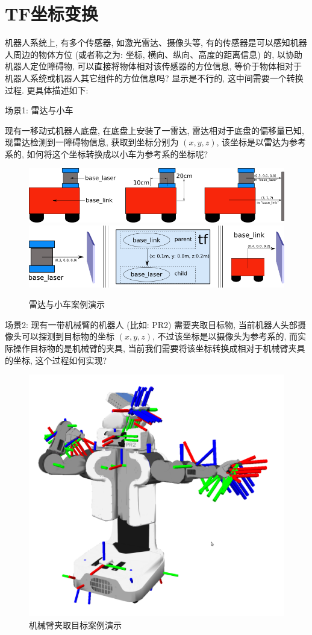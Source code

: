 \documentclass[openany, fontset=windowsold]{ctexbook}
\theoremstyle{kaiti}
\theoremstyle{normal}
\begin{document}
\section{TF坐标变换}

机器人系统上, 有多个传感器, 如激光雷达、摄像头等, 有的传感器是可以感知机器人周边的物体方位 (或者称之为: 坐标, 横向、纵向、高度的距离信息) 的, 以协助机器人定位障碍物, 可以直接将物体相对该传感器的方位信息, 等价于物体相对于机器人系统或机器人其它组件的方位信息吗? 显示是不行的, 这中间需要一个转换过程. 更具体描述如下:

场景1: 雷达与小车

现有一移动式机器人底盘, 在底盘上安装了一雷达, 雷达相对于底盘的偏移量已知, 现雷达检测到一障碍物信息, 获取到坐标分别为 $(x,y,z)$, 该坐标是以雷达为参考系的, 如何将这个坐标转换成以小车为参考系的坐标呢? 

\begin{figure}[!ht]
  \centering
  \includegraphics[width=.8\textwidth]{ros_demo_laser_link_01.png}
  \includegraphics[width=.8\textwidth]{ros_demo_laser_link_02.png}
  \caption{雷达与小车案例演示}
  \label{fig:ros_demo_laser_link}
\end{figure}

场景2: 现有一带机械臂的机器人 (比如: PR2) 需要夹取目标物, 当前机器人头部摄像头可以探测到目标物的坐标 $(x,y,z)$, 不过该坐标是以摄像头为参考系的, 而实际操作目标物的是机械臂的夹具, 当前我们需要将该坐标转换成相对于机械臂夹具的坐标, 这个过程如何实现? 

\begin{figure}[!ht]
  \centering
  \includegraphics[width=.6\textwidth]{ros_demo_pr2.png}
  \caption{机械臂夹取目标案例演示}
  \label{fig:ros_demo_pr2}
\end{figure}
\end{document}
